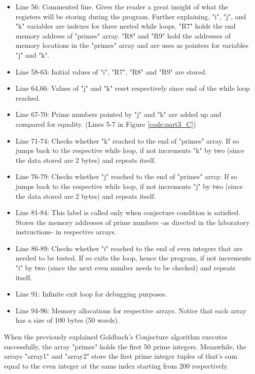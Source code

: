 \documentclass[pdftex,12pt,a4paper]{article}
\begin{document}
\begin{itemize}
    \item Line 56: Commented line. Gives the reader a great insight of what the registers will be storing during the program. Further explaining, "i", "j", and "k" variables are indexes for three nested while loops. "R7" holds the end memory address of "primes" array. "R8" and "R9" hold the addresses of memory locations in the "primes" array and are uses as pointers for variables "j" and "k".
    \item Line 58-63: Initial values of "i", "R7", "R8" and "R9" are stored.
    \item Line 64,66: Values of "j" and "k" reset respectively since end of the while loop reached.
    \item Line 67-70: Prime numbers pointed by "j" and "k" are added up and compared for equality. (Lines 5-7 in Figure \ref{code:part3_C})
    \item Line 71-74: Checks whether "k" reached to the end of "primes" array. If so jumps back to the respective while loop, if not increments "k" by two (since the data stored are 2 bytes) and repeats itself.
    \item Line 76-79: Checks whether "j" reached to the end of "primes" array. If so jumps back to the respective while loop, if not increments "j" by two (since the data stored are 2 bytes) and repeats itself.
    \item Line 81-84: This label is called only when conjecture condition is satisfied. Stores the memory addresses of prime numbers -as directed in the laboratory instructions- in respective arrays.
    \item Line 86-89: Checks whether "i" reached to the end of even integers that are needed to be tested. If so exits the loop, hence the program, if not increments "i" by two (since the next even number needs to be checked) and repeats itself.
    \item Line 91: Infinite exit loop for debugging purposes.
    \item Line 94-96: Memory allocations for respective arrays. Notice that each array has a size of 100 bytes (50 words).
\end{itemize}

\newline
When the previously explained Goldbach's Conjecture algorithm executes successfully,  the array "primes" holds the first 50 prime integers. Meanwhile, the arrays "array1" and "array2" store the first prime integer tuples of that's sum equal to the even integer at the same index starting from 200 respectively.
\end{document}
